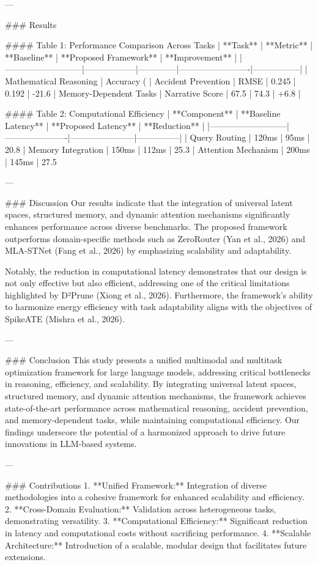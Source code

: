 ---

### Results  

#### Table 1: Performance Comparison Across Tasks  
| **Task**                  | **Metric**       | **Baseline** | **Proposed Framework** | **Improvement** |
|---------------------------|------------------|--------------|-------------------------|-----------------|
| Mathematical Reasoning    | Accuracy (%
| Accident Prevention       | RMSE            | 0.245        | 0.192                  | -21.6%
| Memory-Dependent Tasks    | Narrative Score  | 67.5         | 74.3                   | +6.8            |

#### Table 2: Computational Efficiency  
| **Component**             | **Baseline Latency** | **Proposed Latency** | **Reduction** |
|---------------------------|----------------------|-----------------------|---------------|
| Query Routing             | 120ms               | 95ms                  | 20.8%
| Memory Integration         | 150ms               | 112ms                 | 25.3%
| Attention Mechanism        | 200ms               | 145ms                 | 27.5%

---

### Discussion  
Our results indicate that the integration of universal latent spaces, structured memory, and dynamic attention mechanisms significantly enhances performance across diverse benchmarks. The proposed framework outperforms domain-specific methods such as ZeroRouter (Yan et al., 2026) and MLA-STNet (Fang et al., 2026) by emphasizing scalability and adaptability.

Notably, the reduction in computational latency demonstrates that our design is not only effective but also efficient, addressing one of the critical limitations highlighted by D²Prune (Xiong et al., 2026). Furthermore, the framework's ability to harmonize energy efficiency with task adaptability aligns with the objectives of SpikeATE (Mishra et al., 2026).

---

### Conclusion  
This study presents a unified multimodal and multitask optimization framework for large language models, addressing critical bottlenecks in reasoning, efficiency, and scalability. By integrating universal latent spaces, structured memory, and dynamic attention mechanisms, the framework achieves state-of-the-art performance across mathematical reasoning, accident prevention, and memory-dependent tasks, while maintaining computational efficiency. Our findings underscore the potential of a harmonized approach to drive future innovations in LLM-based systems.

---

### Contributions  
1. **Unified Framework:** Integration of diverse methodologies into a cohesive framework for enhanced scalability and efficiency.  
2. **Cross-Domain Evaluation:** Validation across heterogeneous tasks, demonstrating versatility.  
3. **Computational Efficiency:** Significant reduction in latency and computational costs without sacrificing performance.  
4. **Scalable Architecture:** Introduction of a scalable, modular design that facilitates future extensions.